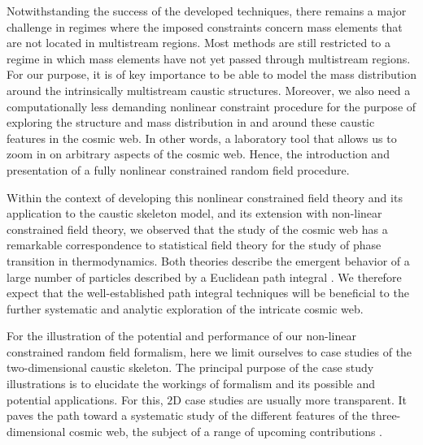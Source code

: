 \documentclass[a4paper, 11pt]{article}
\begin{document}
\bigskip
Notwithstanding the success of the developed techniques, there remains a major challenge in regimes where the imposed constraints concern mass elements that are not located in multistream regions. Most methods are still restricted to a regime in which mass elements have not yet passed through multistream regions. For our purpose, it is of key importance to be able to model the mass distribution around the intrinsically multistream caustic structures. Moreover, we also need a computationally less demanding nonlinear constraint procedure for the purpose of exploring the structure and mass distribution in and around these caustic features in the cosmic web. In other words, a laboratory tool that allows us to zoom in on arbitrary aspects of the cosmic web. Hence, the introduction and presentation of a fully nonlinear constrained random field procedure. 

Within the context of developing this nonlinear constrained field theory and its application to the caustic skeleton model, and its extension with non-linear constrained field theory, we observed that the study of the cosmic web has a remarkable correspondence to statistical field theory for the study of phase transition in thermodynamics. Both theories describe the emergent behavior of a large number of particles described by a Euclidean path integral \cite{Feynman:1965}. We therefore expect that the well-established path integral techniques will be beneficial to the further systematic and analytic exploration of the intricate cosmic web.

\bigskip
For the illustration of the potential and performance of our non-linear constrained random field formalism, here we limit ourselves to case studies of the two-dimensional caustic skeleton. The principal purpose of the case study illustrations is to elucidate the workings of formalism and its possible and potential applications. For this, $2$D case studies are usually more transparent. It paves the path toward a systematic study of the different features of the three-dimensional cosmic web, the subject of a range of upcoming contributions \cite{Feldbrugge:2022}.


\end{document}
